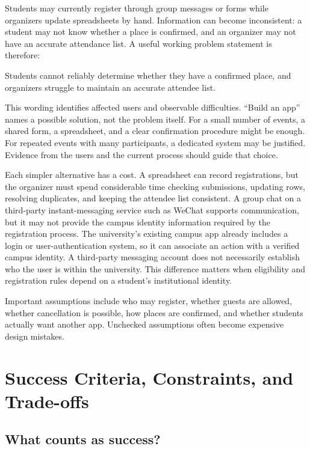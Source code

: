 \documentclass[11pt]{article}
\begin{document}
Students may currently register through group messages or forms while organizers update spreadsheets by hand. Information can become inconsistent: a student may not know whether a place is confirmed, and an organizer may not have an accurate attendance list. A useful working problem statement is therefore:

\begin{definition}
Students cannot reliably determine whether they have a confirmed place, and organizers struggle to maintain an accurate attendee list.
\end{definition}

This wording identifies affected users and observable difficulties. ``Build an app'' names a possible solution, not the problem itself. For a small number of events, a shared form, a spreadsheet, and a clear confirmation procedure might be enough. For repeated events with many participants, a dedicated system may be justified. Evidence from the users and the current process should guide that choice.

Each simpler alternative has a cost. A spreadsheet can record registrations, but the organizer must spend considerable time checking submissions, updating rows, resolving duplicates, and keeping the attendee list consistent. A group chat on a third-party instant-messaging service such as WeChat supports communication, but it may not provide the campus identity information required by the registration process. The university's existing campus app already includes a login or user-authentication system, so it can associate an action with a verified campus identity. A third-party messaging account does not necessarily establish who the user is within the university. This difference matters when eligibility and registration rules depend on a student's institutional identity.

Important assumptions include who may register, whether guests are allowed, whether cancellation is possible, how places are confirmed, and whether students actually want another app. Unchecked assumptions often become expensive design mistakes.

\section{Success Criteria, Constraints, and Trade-offs}

\subsection{What counts as success?}
\end{document}
